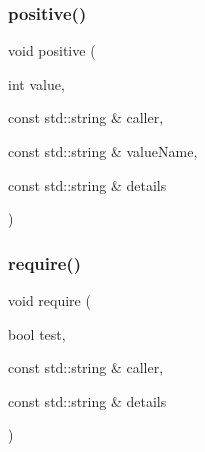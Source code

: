 \mbox{\label{namespacerequire_a64d94146fb46d01da7e8eb081c76562d}} 
\subsubsection{\texorpdfstring{positive()}{positive()}\hspace{0.1cm}{\footnotesize\ttfamily [2/2]}}
{\footnotesize\ttfamily void positive (\begin{DoxyParamCaption}\item[{int}]{value,  }\item[{const std\+::string \&}]{caller,  }\item[{const std\+::string \&}]{value\+Name,  }\item[{const std\+::string \&}]{details }\end{DoxyParamCaption})}

\mbox{\label{namespacerequire_a31784ceeaf8596385d87a754c2bf3aba}} 
\subsubsection{\texorpdfstring{require()}{require()}}
{\footnotesize\ttfamily void require (\begin{DoxyParamCaption}\item[{bool}]{test,  }\item[{const std\+::string \&}]{caller,  }\item[{const std\+::string \&}]{details }\end{DoxyParamCaption})}

